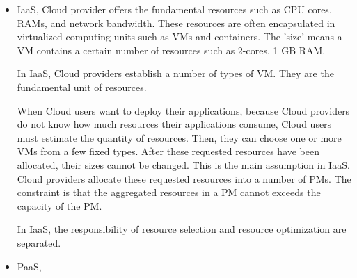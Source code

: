\begin{itemize}
	\item IaaS, Cloud provider offers the fundamental resources such as CPU cores, RAMs, and network bandwidth. These resources are often encapsulated in virtualized computing units such as VMs and containers. The 'size' means a VM contains a certain number of resources such as 2-cores, 1 GB RAM. 

	In IaaS, Cloud providers establish a number of types of VM. They are the fundamental unit of resources. 

	When Cloud users want to deploy their applications, because Cloud providers do not know how much resources their applications consume, Cloud users must estimate the quantity of resources. Then, they can choose one or more VMs from a few fixed types. After these requested resources have been allocated, their sizes cannot be changed. This is the main assumption in IaaS. Cloud providers allocate these requested resources into a number of PMs. The constraint is that the aggregated resources in a PM cannot exceeds the capacity of the PM.



 	In IaaS, the responsibility of resource selection and resource optimization are separated.

 	\item PaaS, 
\end{itemize}


